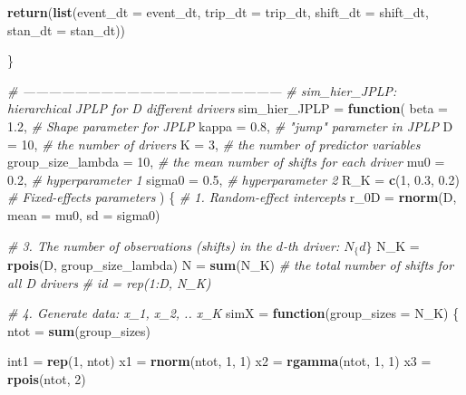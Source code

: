 \documentclass[
]{article}
\newenvironment{Shaded}{\begin{snugshade}}{\end{snugshade}}
\newcommand{\CommentTok}[1]{\textcolor[rgb]{0.56,0.35,0.01}{\textit{#1}}}
\newcommand{\ControlFlowTok}[1]{\textcolor[rgb]{0.13,0.29,0.53}{\textbf{#1}}}
\newcommand{\DataTypeTok}[1]{\textcolor[rgb]{0.13,0.29,0.53}{#1}}
\newcommand{\DecValTok}[1]{\textcolor[rgb]{0.00,0.00,0.81}{#1}}
\newcommand{\FloatTok}[1]{\textcolor[rgb]{0.00,0.00,0.81}{#1}}
\newcommand{\KeywordTok}[1]{\textcolor[rgb]{0.13,0.29,0.53}{\textbf{#1}}}
\newcommand{\NormalTok}[1]{#1}
\newcommand{\StringTok}[1]{\textcolor[rgb]{0.31,0.60,0.02}{#1}}
\begin{document}
\begin{Shaded}
\begin{Highlighting}[]
  \KeywordTok{return}\NormalTok{(}\KeywordTok{list}\NormalTok{(}\DataTypeTok{event_dt =}\NormalTok{ event_dt,}
              \DataTypeTok{trip_dt =}\NormalTok{ trip_dt,}
              \DataTypeTok{shift_dt =}\NormalTok{ shift_dt,}
              \DataTypeTok{stan_dt =}\NormalTok{ stan_dt))}

\NormalTok{\}}

\CommentTok{# ------------------------------------------------------------}
\CommentTok{# sim_hier_JPLP:  hierarchical JPLP for D different drivers}
\NormalTok{sim_hier_JPLP =}\StringTok{ }\ControlFlowTok{function}\NormalTok{(}
  \DataTypeTok{beta =} \FloatTok{1.2}\NormalTok{,              }\CommentTok{# Shape parameter for JPLP}
  \DataTypeTok{kappa =} \FloatTok{0.8}\NormalTok{,             }\CommentTok{# "jump" parameter in JPLP}
  \DataTypeTok{D =} \DecValTok{10}\NormalTok{,                  }\CommentTok{# the number of drivers}
  \DataTypeTok{K =} \DecValTok{3}\NormalTok{,                   }\CommentTok{# the number of predictor variables}
  \DataTypeTok{group_size_lambda =} \DecValTok{10}\NormalTok{,  }\CommentTok{# the mean number of shifts for each driver}
  \DataTypeTok{mu0 =} \FloatTok{0.2}\NormalTok{,               }\CommentTok{# hyperparameter 1}
  \DataTypeTok{sigma0 =} \FloatTok{0.5}\NormalTok{,            }\CommentTok{# hyperparameter 2}
  \DataTypeTok{R_K =} \KeywordTok{c}\NormalTok{(}\DecValTok{1}\NormalTok{, }\FloatTok{0.3}\NormalTok{, }\FloatTok{0.2}\NormalTok{)     }\CommentTok{# Fixed-effects parameters}
\NormalTok{)}
\NormalTok{\{}
  \CommentTok{# 1. Random-effect intercepts}
\NormalTok{  r_0D =}\StringTok{ }\KeywordTok{rnorm}\NormalTok{(D, }\DataTypeTok{mean =}\NormalTok{ mu0, }\DataTypeTok{sd =}\NormalTok{ sigma0)}

  \CommentTok{# 3. The number of observations (shifts) in the $d$-th driver: $N_\{d\}$}
\NormalTok{  N_K =}\StringTok{ }\KeywordTok{rpois}\NormalTok{(D, group_size_lambda)}
\NormalTok{  N =}\StringTok{ }\KeywordTok{sum}\NormalTok{(N_K) }\CommentTok{# the total number of shifts for all D drivers}
  \CommentTok{# id = rep(1:D, N_K)}

  \CommentTok{# 4. Generate data: x_1, x_2, .. x_K}
\NormalTok{  simX =}\StringTok{ }\ControlFlowTok{function}\NormalTok{(}\DataTypeTok{group_sizes =}\NormalTok{ N_K)}
\NormalTok{  \{}
\NormalTok{    ntot =}\StringTok{ }\KeywordTok{sum}\NormalTok{(group_sizes)}

\NormalTok{    int1 =}\StringTok{ }\KeywordTok{rep}\NormalTok{(}\DecValTok{1}\NormalTok{, ntot)}
\NormalTok{    x1 =}\StringTok{  }\KeywordTok{rnorm}\NormalTok{(ntot, }\DecValTok{1}\NormalTok{, }\DecValTok{1}\NormalTok{)}
\NormalTok{    x2 =}\StringTok{ }\KeywordTok{rgamma}\NormalTok{(ntot, }\DecValTok{1}\NormalTok{, }\DecValTok{1}\NormalTok{)}
\NormalTok{    x3 =}\StringTok{  }\KeywordTok{rpois}\NormalTok{(ntot, }\DecValTok{2}\NormalTok{)}


\end{Highlighting}
\end{Shaded}
\end{document}

